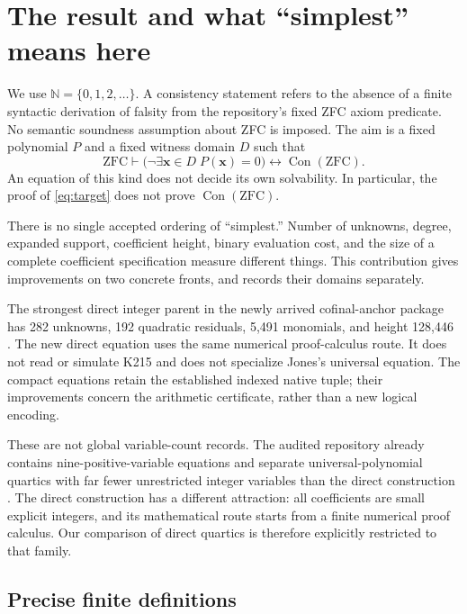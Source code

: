 \documentclass[11pt]{article}
\newcommand{\N}{\mathbb N}
\newcommand{\Con}{\operatorname{Con}}
\newcommand{\ZFC}{\mathrm{ZFC}}
\theoremstyle{remark}
\numberwithin{equation}{section}
\begin{document}
\section{The result and what ``simplest'' means here}

We use $\N=\{0,1,2,\ldots\}$. A consistency statement refers to the absence of a finite syntactic derivation of falsity from the repository's fixed ZFC axiom predicate. No semantic soundness assumption about ZFC is imposed. The aim is a fixed polynomial $P$ and a fixed witness domain $D$ such that
\begin{equation}\label{eq:target}
\ZFC\vdash \bigl(\neg\exists\mathbf x\in D\;P(\mathbf x)=0\bigr)
\longleftrightarrow \Con(\ZFC).
\end{equation}
An equation of this kind does not decide its own solvability. In particular, the proof of \eqref{eq:target} does not prove $\Con(\ZFC)$.

There is no single accepted ordering of ``simplest.'' Number of unknowns, degree, expanded support, coefficient height, binary evaluation cost, and the size of a complete coefficient specification measure different things. This contribution gives improvements on two concrete fronts, and records their domains separately.



The strongest direct integer parent in the newly arrived cofinal-anchor package has 282 unknowns, 192 quadratic residuals, 5,491 monomials, and height 128,446 \cite{cofinal}. The new direct equation uses the same numerical proof-calculus route. It does not read or simulate K215 and does not specialize Jones's universal equation. The compact equations retain the established indexed native tuple; their improvements concern the arithmetic certificate, rather than a new logical encoding.

These are not global variable-count records. The audited repository already contains nine-positive-variable equations and separate universal-polynomial quartics with far fewer unrestricted integer variables than the direct construction \cite{repository}. The direct construction has a different attraction: all coefficients are small explicit integers, and its mathematical route starts from a finite numerical proof calculus. Our comparison of direct quartics is therefore explicitly restricted to that family.

\subsection{Precise finite definitions}
\end{document}
